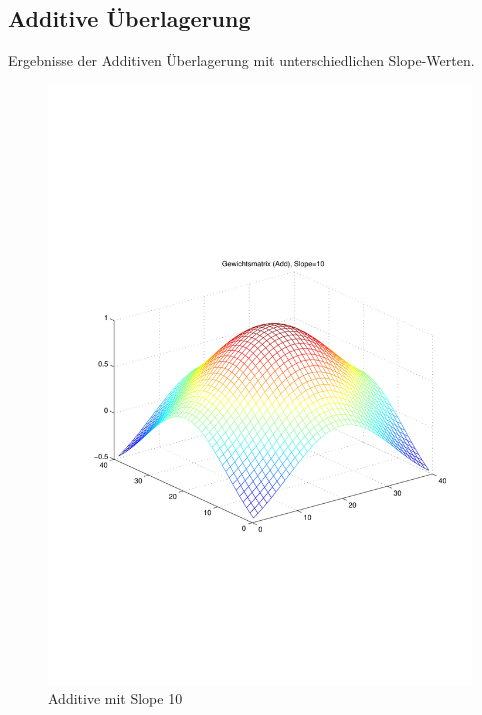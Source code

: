 \newpage
\subsection{Additive Überlagerung}
Ergebnisse der Additiven Überlagerung mit unterschiedlichen Slope-Werten.
\begin{figure}[hbt]
	\begin{minipage}{0.48\textwidth}
		\includegraphics[trim=70 200 32 242, clip, width=\textwidth]{./Bilder/Auswertung/Gewichtsmatrix/Gewichtsmatrix_Add_Slope_10}
		\caption{Additive mit Slope 10}
		\label{Add10}
	\end{minipage}
	\hfill
	\begin{minipage}{0.48\textwidth}

\end{minipage}
\end{figure}
